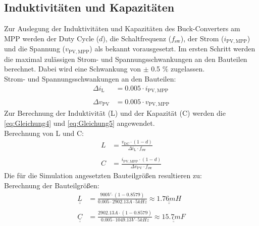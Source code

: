 \subsection{Induktivitäten und Kapazitäten}
\label{sec:Induktivitaten_und_Kapazitaeten}
Zur Auslegung der Induktivitäten und Kapazitäten des Buck-Converters am MPP werden der Duty Cycle ($d$), die Schaltfrequenz ($f_{\mathrm{sw}}$), der Strom ($i_{\mathrm{PV,MPP}}$) und die Spannung ($v_{\mathrm{PV,MPP}}$) als bekannt vorausgesetzt. Im ersten Schritt werden die maximal zulässigen Strom- und Spannungsschwankungen an den Bauteilen berechnet. Dabei wird eine Schwankung von $\pm$ 0.5 $\%$ zugelassen.\\
Strom- und Spannungsschwankungen an den Bauteilen:
\begin{align*}
    \Delta i_{\mathrm{L}} &= 0.005 \cdot i_{\mathrm{PV,MPP}} \\\\
    \Delta v_{\mathrm{PV}} &= 0.005 \cdot v_{\mathrm{PV,MPP}}
\end{align*}
\newline
Zur Berechnung der Induktivität (L) und der Kapazität (C) werden die \autoref{eq:Gleichung4} und \autoref{eq:Gleichung5} angewendet.\\
\newline
Berechnung von L und C:
\begin{align}
    L &= \frac{v_{\mathrm{DC}}\cdot(1-d)}{\Delta i_{\mathrm{L}}\cdot f_{\mathrm{sw}}} \label{eq:Gleichung4}\\ \nonumber \\
    C &= \frac{i_{\mathrm{PV,MPP}}\cdot(1-d)}{\Delta v_{\mathrm{PV}}\cdot f_{\mathrm{sw}}} \label{eq:Gleichung5}
\end{align}
\newline
Die für die Simulation angesetzten Bauteilgrößen resultieren zu:\\
\newline
Berechnung der Bauteilgrößen:
\begin{align}
     \underline{\underline{L}} &= \frac{900V\cdot(1-0.8579)}{0.005\cdot 2902.13A\cdot 5kHz} \approx \underline{\underline{1.76mH}} \label{eq:Gleichung6} \\ \nonumber \\
     \underline{\underline{C}} &= \frac{2902.13A\cdot (1-0.8579)}{0.005\cdot 1049.13V\cdot 5kHz} \approx \underline{\underline{15.7mF}} \label{eq:Gleichung7}
\end{align}
